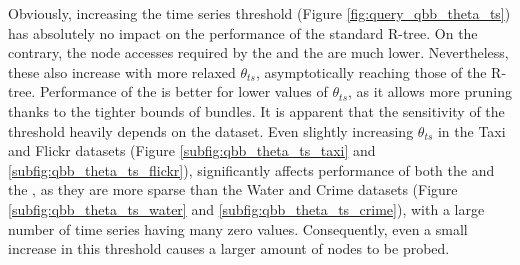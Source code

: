 Obviously, increasing the time series threshold (Figure \ref{fig:query_qbb_theta_ts}) has absolutely no impact on the performance of the standard R-tree. On the contrary, the node accesses required by the \tsr and the \btsr are much lower. Nevertheless, these also increase with more relaxed $\theta_{ts}$, asymptotically reaching those of the R-tree. Performance of the \btsr is better for lower values of $\theta_{ts}$, as it allows more pruning thanks to the tighter bounds of bundles. It is apparent that the sensitivity of the threshold heavily depends on the dataset. Even slightly increasing $\theta_{ts}$ in the Taxi and Flickr datasets (Figure \ref{subfig:qbb_theta_ts_taxi} and \ref{subfig:qbb_theta_ts_flickr}), significantly affects performance of both the \tsr and the \btsr, as they are more sparse than the Water and Crime datasets (Figure \ref{subfig:qbb_theta_ts_water} and \ref{subfig:qbb_theta_ts_crime}), with a large number of time series having many zero values. Consequently, even a small increase in this threshold causes a larger amount of nodes to be probed.

